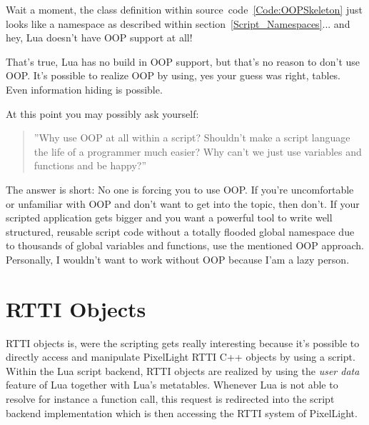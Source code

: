 Wait a moment, the class definition within source~code~\ref{Code:OOPSkeleton} just looks like a namespace as described within section~\ref{Script_Namespaces}... and hey, Lua doesn't have OOP support at all!

That's true, Lua has no build in OOP support, but that's no reason to don't use OOP. It's possible to realize OOP by using, yes your guess was right, tables. Even information hiding is possible.

At this point you may possibly ask yourself: \begin{quote}''Why use OOP at all within a script? Shouldn't make a script language the life of a programmer much easier? Why can't we just use variables and functions and be happy?''\end{quote} The answer is short: No one is forcing you to use OOP. If you're uncomfortable or unfamiliar with OOP and don't want to get into the topic, then don't. If your scripted application gets bigger and you want a powerful tool to write well structured, reusable script code without a totally flooded global namespace due to thousands of global variables and functions, use the mentioned OOP approach. Personally, I wouldn't want to work without OOP because I'am a lazy person.




\section{\ac{RTTI} Objects}
\label{Script_RTTIObjects}
\ac{RTTI} objects is, were the scripting gets really interesting because it's possible to directly access and manipulate PixelLight \ac{RTTI} C++ objects by using a script. Within the Lua script backend, \ac{RTTI} objects are realized by using the \emph{user data} feature of Lua together with Lua's metatables. Whenever Lua is not able to resolve for instance a function call, this request is redirected into the script backend implementation which is then accessing the \ac{RTTI} system of PixelLight.

